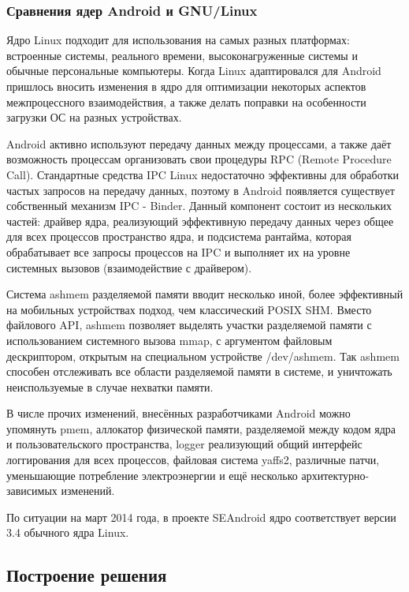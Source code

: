 \subsubsection{Сравнения ядер Android и GNU/Linux}

Ядро Linux подходит для использования на самых разных платформах:
встроенные системы, реального времени, высоконагруженные системы и
обычные персональные компьютеры. Когда Linux адаптировался для Android
пришлось вносить изменения в ядро для оптимизации некоторых аспектов
межпроцессного взаимодействия, а также делать поправки на особенности
загрузки ОС на разных устройствах.

Android активно используют передачу данных между процессами, а также
даёт возможность процессам организовать свои процедуры RPC (Remote
Procedure Call). Стандартные средства IPC Linux недостаточно эффективны
для обработки частых запросов на передачу данных, поэтому в Android
появляется существует собственный механизм IPC - Binder. Данный
компонент состоит из нескольких частей: драйвер ядра, реализующий
эффективную передачу данных через общее для всех процессов пространство
ядра, и подсистема рантайма, которая обрабатывает все запросы процессов
на IPC и выполняет их на уровне системных вызовов (взаимодействие с
драйвером).

Система ashmem разделяемой памяти вводит несколько иной, более
эффективный на мобильных устройствах подход, чем классический POSIX SHM.
Вместо файлового API, ashmem позволяет выделять участки разделяемой
памяти с использованием системного вызова mmap, с аргументом файловым
дескриптором, открытым на специальном устройстве /dev/ashmem. Так ashmem
способен отслеживать все области разделяемой памяти в системе, и
уничтожать неиспользуемые в случае нехватки памяти.

В числе прочих изменений, внесённых разработчиками Android можно
упомянуть pmem, аллокатор физической памяти, разделяемой между кодом
ядра и пользовательского пространства, logger реализующий общий
интерфейс логгирования для всех процессов, файловая система yaffs2,
различные патчи, уменьшающие потребление электроэнергии и ещё несколько
архитектурно-зависимых изменений.

По ситуации на март 2014 года, в проекте SEAndroid ядро соответствует 
версии 3.4 обычного ядра Linux.

\subsection{Построение решения}

